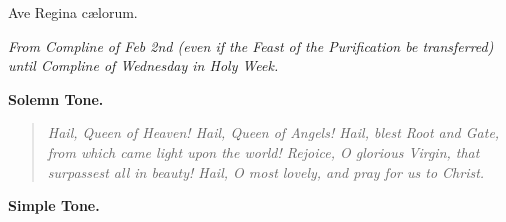 \documentclass[11pt]{extarticle} %
\renewcommand*\oldstylenums[1]{{\fontfamily{fxlj}\selectfont #1}}
\begin{document}
\begin{center}\begin{huge}Ave Regina cælorum.\end{huge}\end{center}

\textit{From Compline of Feb 2nd (even if the Feast of the Purification be transferred) until Compline of Wednesday in Holy Week.}
\begin{center}\textbf{Solemn Tone.}\end{center}


\def\greinitialformat#1{%
{\fontsize{43}{43}\selectfont #1}%
}


\setsecondannotation{\small \oldstylenums{ \textbf{6.}}}



\begin{quote}
\textit{Hail, Queen of Heaven! Hail, Queen of Angels! Hail, blest Root and Gate, from which came light upon the world! Rejoice, O glorious Virgin, that surpassest all in beauty! Hail, O most lovely, and pray for us to Christ.}
\end{quote}
\begin{center}\textbf{Simple Tone.}\end{center}

\end{document}
